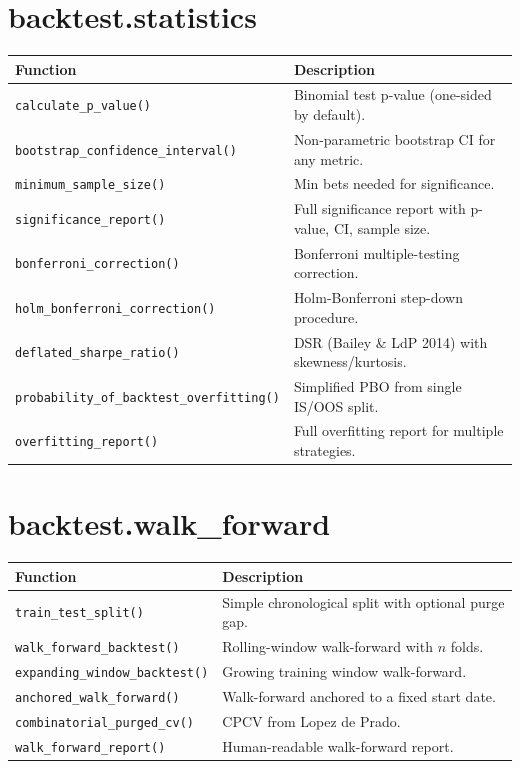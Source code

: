 \documentclass[12pt,a4paper]{report}
\theoremstyle{definition}
\newcommand{\func}[1]{\texttt{#1()}}
\begin{document}
\section{backtest.statistics}

\begin{longtable}{lp{9cm}}
\toprule
\textbf{Function} & \textbf{Description} \\
\midrule
\endhead
\func{calculate\_p\_value} & Binomial test p-value (one-sided by default). \\
\func{bootstrap\_confidence\_interval} & Non-parametric bootstrap CI for any metric. \\
\func{minimum\_sample\_size} & Min bets needed for significance. \\
\func{significance\_report} & Full significance report with p-value, CI, sample size. \\
\func{bonferroni\_correction} & Bonferroni multiple-testing correction. \\
\func{holm\_bonferroni\_correction} & Holm-Bonferroni step-down procedure. \\
\func{deflated\_sharpe\_ratio} & DSR (Bailey \& LdP 2014) with skewness/kurtosis. \\
\func{probability\_of\_backtest\_overfitting} & Simplified PBO from single IS/OOS split. \\
\func{overfitting\_report} & Full overfitting report for multiple strategies. \\
\bottomrule
\end{longtable}

\section{backtest.walk\_forward}

\begin{longtable}{lp{9cm}}
\toprule
\textbf{Function} & \textbf{Description} \\
\midrule
\endhead
\func{train\_test\_split} & Simple chronological split with optional purge gap. \\
\func{walk\_forward\_backtest} & Rolling-window walk-forward with $n$ folds. \\
\func{expanding\_window\_backtest} & Growing training window walk-forward. \\
\func{anchored\_walk\_forward} & Walk-forward anchored to a fixed start date. \\
\func{combinatorial\_purged\_cv} & CPCV from Lopez de Prado. \\
\func{walk\_forward\_report} & Human-readable walk-forward report. \\
\bottomrule
\end{longtable}
\end{document}
